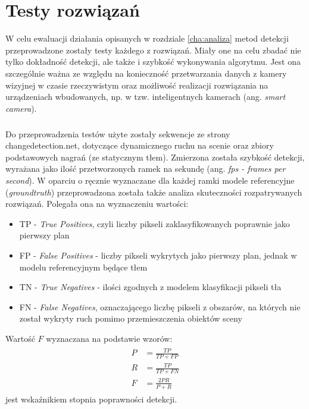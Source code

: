 \chapter{Testy rozwiązań}
\label{cha:testy}
\renewcommand{\tablename}{Tabela}

W celu ewaluacji działania opisanych w rozdziale \ref{cha:analiza} metod detekcji przeprowadzone zostały testy każdego z rozwiązań. Miały one na celu zbadać nie tylko dokładność detekcji, ale także i szybkość wykonywania algorytmu. Jest ona szczególnie ważna ze względu na konieczność przetwarzania danych z kamery wizyjnej w czasie rzeczywistym oraz możliwość realizacji rozwiązania na urządzeniach wbudowanych, np. w tzw. inteligentnych kamerach (ang. \textit{smart camera}). 
\paragraph{}
Do przeprowadzenia testów użyte zostały sekwencje ze strony changedetection.net, dotyczące dynamicznego ruchu na scenie oraz zbiory podstawowych nagrań (ze statycznym tłem). Zmierzona została szybkość detekcji, wyrażana jako ilość przetworzonych ramek na sekundę (ang. \textit{fps - frames per second}). W oparciu o ręcznie wyznaczane dla każdej ramki modele referencyjne (\textit{groundtruth}) przeprowadzona została także analiza skuteczności rozpatrywanych rozwiązań. Polegała ona na wyznaczeniu wartości:
\begin{itemize}
\item TP - \textit{True Positives}, czyli liczby pikseli zaklasyfikowanych poprawnie jako pierwszy plan
\item FP - \textit{False Positives} - liczby pikseli wykrytych jako pierwszy plan, jednak w modelu referencyjnym będące tłem
\item TN - \textit{True Negatives} - ilości zgodnych z modelem klasyfikacji pikseli tła
\item FN - \textit{False Negatives}, oznaczającego liczbę pikseli z obszarów, na których nie został wykryty ruch pomimo przemieszczenia obiektów sceny
\end{itemize}
Wartość $F$ wyznaczana na podstawie wzorów:
\begin{align}
\begin{split}
P &= \frac{TP}{TP+FP} \\
R &= \frac{TP}{TP+FN} \\
F &= \frac{2PR}{P+R}
\end{split}
\end{align}
jest wskaźnikiem stopnia poprawności detekcji.
\\

